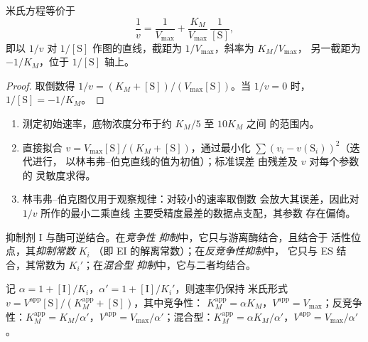 \begin{proposition}\label{prop:b3:complex-kinetics:lineweaver}
米氏方程等价于
\[
  \frac1v = \frac{1}{V_{\max}} + \frac{K_M}{V_{\max}}\,\frac{1}{[\mathrm S]},
\]
即以 $1/v$ 对 $1/[\mathrm S]$ 作图的直线，截距为 $1/V_{\max}$，斜率为 $K_M/V_{\max}$，
另一截距为 $-1/K_M$，位于 $1/[\mathrm S]$ 轴上。
\end{proposition}

\begin{proof}
取倒数得 $1/v = (K_M + [\mathrm S])/(V_{\max}[\mathrm S])$。当 $1/v = 0$ 时，$1/[\mathrm S] = -1/K_M$。
\end{proof}

\begin{method}\label{met:b3:complex-kinetics:mm-fit}
\begin{enumerate}
  \item 测定初始速率，底物浓度分布于约 $K_M/5$ 至 $10K_M$ 之间
        的范围内。
  \item 直接拟合 $v = V_{\max}[\mathrm S]/(K_M + [\mathrm S])$，通过最小化 $\sum(v_i - v(\mathrm S_i))^2$（迭代进行，
        以林韦弗–伯克直线的值为初值）；标准误差
        由残差及 $v$ 对每个参数的
        灵敏度求得。
  \item 林韦弗–伯克图仅用于观察规律：对较小的速率取倒数
        会放大其误差，因此对 $1/v$ 所作的最小二乘直线
        主要受精度最差的数据点支配，其参数
        存在偏倚。
\end{enumerate}
\end{method}

\begin{definition}[抑制]\label{def:b3:complex-kinetics:inhibition}
抑制剂 I 与酶可逆结合。在\emph{竞争性
抑制}中，它只与游离酶结合，且结合于
活性位点，其\emph{抑制常数} $K_i$
（即 EI 的解离常数）；在\emph{反竞争性抑制}中，
它只与 ES 结合，其常数为 $K_i'$；在\emph{混合型
抑制}中，它与二者均结合。
\end{definition}

\begin{proposition}[抑制作用下的速率规律]\label{prop:b3:complex-kinetics:inhibition-laws}
记 $\alpha = 1 + [\mathrm I]/K_i$，$\alpha' = 1 + [\mathrm I]/K_i'$，则速率仍保持
米氏形式 $v = V^{\mathrm{app}}[\mathrm S]/(K_M^{\mathrm{app}} + [\mathrm S])$，其中竞争性：
$K_M^{\mathrm{app}} = \alpha K_M$，$V^{\mathrm{app}} = V_{\max}$；反竞争性：$K_M^{\mathrm{app}} = K_M/\alpha'$，$V^{\mathrm{app}} =
V_{\max}/\alpha'$；混合型：$K_M^{\mathrm{app}} = \alpha K_M/\alpha'$，$V^{\mathrm{app}} = V_{\max}/\alpha'$。
\end{proposition}

